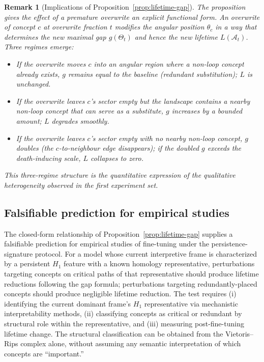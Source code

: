 \documentclass[12pt]{article}
\newtheorem{remark}{Remark}
\begin{document}
\begin{remark}[Implications of Proposition~\ref{prop:lifetime-gap}]
The proposition gives the effect of a premature overwrite an
explicit functional form. An overwrite of concept $c$ at overwrite
fraction $t$ modifies the angular position $\theta_c$ in a way
that determines the new maximal gap $g(\Theta_t)$ and hence the
new lifetime $L(\mathcal{A}_t)$. Three regimes emerge:
\begin{itemize}[noitemsep]
\item If the overwrite moves $c$ into an angular region where a
  non-loop concept already exists, $g$ remains equal to the
  baseline (redundant substitution); $L$ is unchanged.
\item If the overwrite leaves $c$'s sector empty but the landscape
  contains a nearby non-loop concept that can serve as a substitute,
  $g$ increases by a bounded amount; $L$ degrades smoothly.
\item If the overwrite leaves $c$'s sector empty with no nearby
  non-loop concept, $g$ doubles (the $c$-to-neighbour edge
  disappears); if the doubled $g$ exceeds the death-inducing scale,
  $L$ collapses to zero.
\end{itemize}
This three-regime structure is the quantitative expression of the
qualitative heterogeneity observed in the first experiment set.
\end{remark}

\subsection*{Falsifiable prediction for empirical studies}

The closed-form relationship of
Proposition~\ref{prop:lifetime-gap} supplies a falsifiable
prediction for empirical studies of fine-tuning under the
persistence-signature protocol. For a model whose current
interpretive frame is characterized by a persistent $H_1$ feature
with a known homology representative, perturbations targeting
concepts on critical paths of that representative should produce
lifetime reductions following the gap formula; perturbations
targeting redundantly-placed concepts should produce negligible
lifetime reduction. The test requires (i) identifying the current
dominant frame's $H_1$ representative via mechanistic
interpretability methods, (ii) classifying concepts as critical or
redundant by structural role within the representative, and
(iii) measuring post-fine-tuning lifetime change. The structural
classification can be obtained from the Vietoris--Rips complex
alone, without assuming any semantic interpretation of which
concepts are ``important.''
\end{document}
